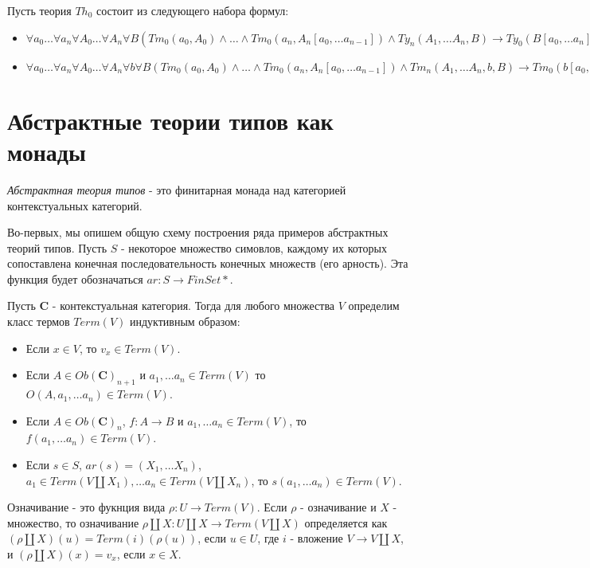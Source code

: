 \documentclass{amsart}
\theoremstyle{definition}
\theoremstyle{remark}
\newcommand{\cat}[1]{\mathbf{#1}}
\renewcommand{\C}{\cat{C}}
\numberwithin{figure}{section}
\begin{document}
Пусть теория $Th_0$ состоит из следующего набора формул:
\begin{itemize}
\item $\forall a_0 \ldots \forall a_n \forall A_0 \ldots \forall A_n \forall B (Tm_0(a_0, A_0) \land \ldots \land Tm_0(a_n, A_n[a_0, \ldots a_{n-1}]) \land Ty_n(A_1, \ldots A_n, B) \to Ty_0(B[a_0, \ldots a_n]))$
\item $\forall a_0 \ldots \forall a_n \forall A_0 \ldots \forall A_n \forall b \forall B (Tm_0(a_0, A_0) \land \ldots \land Tm_0(a_n, A_n[a_0, \ldots a_{n-1}]) \land Tm_n(A_1, \ldots A_n, b, B) \to Tm_0(b[a_0, \ldots a_n], B[a_0, \ldots a_n]))$
\end{itemize}

\section{Абстрактные теории типов как монады}

\begin{defn}
\emph{Абстрактная теория типов} - это финитарная монада над категорией контекстуальных категорий.
\end{defn}

Во-первых, мы опишем общую схему построения ряда примеров абстрактных теорий типов.
Пусть $S$ - некоторое множество симовлов, каждому их которых сопоставлена конечная последовательность конечных множеств (его арность).
Эта функция будет обозначаться $ar : S \to FinSet*$.

Пусть $\C$ - контекстуальная категория.
Тогда для любого множества $V$ определим класс термов $Term(V)$ индуктивным образом:
\begin{itemize}
\item Если $x \in V$, то $v_x \in Term(V)$.
\item Если $A \in Ob(\C)_{n + 1}$ и $a_1, \ldots a_n \in Term(V)$ то $O(A, a_1, \ldots a_n) \in Term(V)$.
\item Если $A \in Ob(\C)_n$, $f : A \to B$ и $a_1, \ldots a_n \in Term(V)$, то $f(a_1, \ldots a_n) \in Term(V)$.
\item Если $s \in S$, $ar(s) = (X_1, \ldots X_n)$, $a_1 \in Term(V \amalg X_1), \ldots a_n \in Term(V \amalg X_n)$, то $s(a_1, \ldots a_n) \in Term(V)$.
\end{itemize}

Означивание - это фукнция вида $\rho : U \to Term(V)$.
Если $\rho$ - означивание и $X$ - множество, то означивание $\rho \amalg X : U \amalg X \to Term(V \amalg X)$ определяется как $(\rho \amalg X)(u) = Term(i)(\rho(u))$, если $u \in U$, где $i$ - вложение $V \to V \amalg X$, и $(\rho \amalg X)(x) = v_x$, если $x \in X$.
\end{document}
